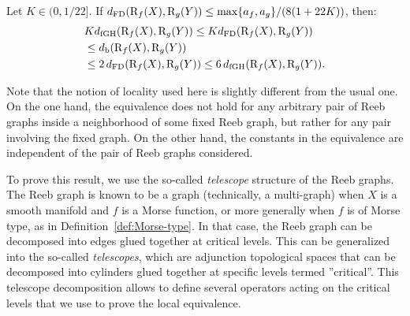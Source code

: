 \begin{thm}\label{th:locisom}
Let $K\in(0,1/22]$. If $d_{\rm FD}(\mathrm{R}_f(X),\mathrm{R}_g(Y))\leq\max\{a_f,a_g\}/(8(1+22K))$, then:
\begin{align}
& Kd_{\rm fGH}(\mathrm{R}_f(X),\mathrm{R}_g(Y)) \leq Kd_{\rm FD}(\mathrm{R}_f(X),\mathrm{R}_g(Y))\nonumber\\
&\leq d_{\rm b}(\mathrm{R}_f(X),\mathrm{R}_g(Y)) \label{eq:lowerbound}\\
&\leq 2\,d_{\rm FD}(\mathrm{R}_f(X),\mathrm{R}_g(Y))\leq 6\,d_{\rm fGH}(\mathrm{R}_f(X),\mathrm{R}_g(Y)).\nonumber
\end{align} 
\end{thm}


Note that the notion of locality used here is slightly different from
the usual one.  On the one hand, the equivalence does not hold for any
arbitrary pair of Reeb graphs inside a neighborhood of some fixed Reeb
graph, but rather for any pair involving the fixed graph. 
On the other hand, the constants in the equivalence are independent of the pair of Reeb graphs considered. 

To prove this result, we use the so-called {\em telescope} structure of the Reeb graphs.
The Reeb graph is known to be a graph (technically, a multi-graph) when $X$ is a smooth
manifold and $f$ is a Morse function, or more generally when $f$ is of Morse 
type, as in Definition~\ref{def:Morse-type}.
In that case, the Reeb graph can be decomposed into edges glued together
at critical levels. This can be generalized into the so-called {\em telescopes}, 
which are adjunction topological spaces that
can be decomposed into cylinders %
glued together at specific levels termed ''critical''.
This telescope decomposition allows to define several operators acting on the critical levels %
that we use 
to prove the local equivalence. %

